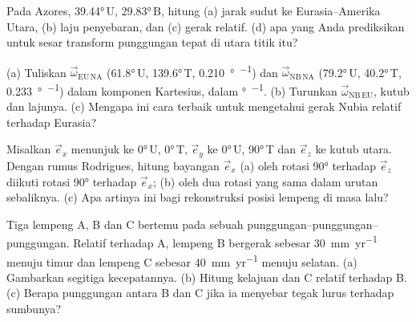 \begin{exercise}[$\star\star$]\label{exo:b1:plate-kinematics:6}
Pada  Azores, \ang{39.44}\,U, \ang{29.83}\,B, hitung (a) jarak sudut ke  Eurasia--Amerika Utara, (b) laju penyebaran, dan (c)  gerak relatif. (d)  apa yang Anda prediksikan untuk sesar transform punggungan tepat di utara titik itu?
\end{exercise}

\begin{exercise}[$\star\star$]\label{exo:b1:plate-kinematics:7}
(a) Tuliskan  $\vec\omega_{\mathrm{EU\,NA}}$ (\ang{61.8}\,U, \ang{139.6}\,T, \qty{0.210}{\degree\per\Ma}) dan $\vec\omega_{\mathrm{NB\,NA}}$ (\ang{79.2}\,U, \ang{40.2}\,T, \qty{0.233}{\degree\per\Ma}) dalam komponen Kartesius, dalam \unit{\degree\per\Ma}. (b) Turunkan $\vec\omega_{\mathrm{NB\,EU}}$, kutub dan lajunya. (c) Mengapa ini cara terbaik untuk mengetahui gerak Nubia relatif terhadap Eurasia?
\end{exercise}

\begin{exercise}[$\star\star$]\label{exo:b1:plate-kinematics:8}
Misalkan $\vec e_x$ menunjuk ke \ang{0}\,U, \ang{0}\,T, $\vec e_y$ ke \ang{0}\,U, \ang{90}\,T dan $\vec e_z$ ke kutub utara. Dengan rumus Rodrigues, hitung bayangan $\vec e_x$ (a) oleh rotasi \ang{90} terhadap $\vec e_z$ diikuti rotasi \ang{90} terhadap $\vec e_x$; (b) oleh dua rotasi yang sama dalam urutan sebaliknya. (c) Apa artinya ini bagi rekonstruksi posisi lempeng di masa lalu?
\end{exercise}

\begin{exercise}[$\star\star$]\label{exo:b1:plate-kinematics:9}
Tiga lempeng A, B dan C bertemu pada sebuah  punggungan--punggungan--punggungan. Relatif terhadap A, lempeng B bergerak sebesar \qty{30}{mm.yr^{-1}} menuju timur dan lempeng C sebesar \qty{40}{mm.yr^{-1}} menuju selatan. (a) Gambarkan segitiga kecepatannya. (b) Hitung kelajuan dan  C relatif terhadap B. (c) Berapa  punggungan antara B dan C jika ia menyebar tegak lurus terhadap sumbunya?
\end{exercise}

